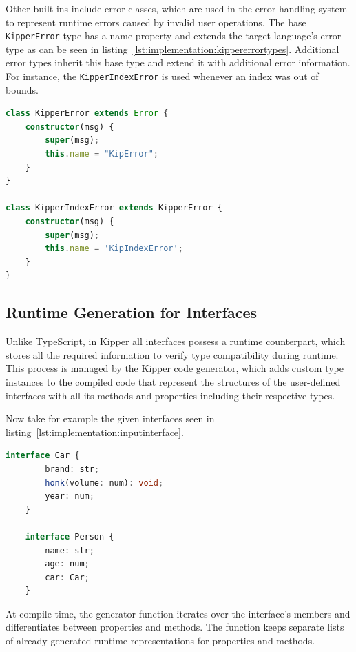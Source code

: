 Other built-ins include error classes, which are used in the error handling system to represent runtime errors caused by invalid user operations. The base \lstinline|KipperError| type has a name property and extends the target language's error type as can be seen in listing~\ref{lst:implementation:kippererrortypes}. Additional error types inherit this base type and extend it with additional error information. For instance, the  \lstinline|KipperIndexError| is used whenever an index was out of bounds.

\begin{lstlisting}[language=Typescript,caption=Kipper error types,label=lst:implementation:kippererrortypes]
class KipperError extends Error {
	constructor(msg) {
		super(msg);
		this.name = "KipError";
	}
}

class KipperIndexError extends KipperError {
	constructor(msg) { 
		super(msg); 
		this.name = 'KipIndexError'; 
	} 
}
\end{lstlisting}

\subsection{Runtime Generation for Interfaces}

Unlike TypeScript, in Kipper all interfaces possess a runtime counterpart, which stores all the required information to verify type compatibility during runtime. This process is managed by the Kipper code generator, which adds custom type instances to the compiled code that represent the structures of the user-defined interfaces with all its methods and properties including their respective types.

Now take for example the given interfaces seen in listing~\ref{lst:implementation:inputinterface}.

\begin{lstlisting}[language=Typescript,caption=Example interfaces in the Kipper language,label=lst:implementation:inputinterface]
	interface Car {
		brand: str;
		honk(volume: num): void;
		year: num;
	}

	interface Person {
		name: str;
		age: num;
		car: Car;
	}
\end{lstlisting}

At compile time, the generator function iterates over the interface's members and differentiates between properties and methods. The function keeps separate lists of already generated runtime representations for properties and methods.

